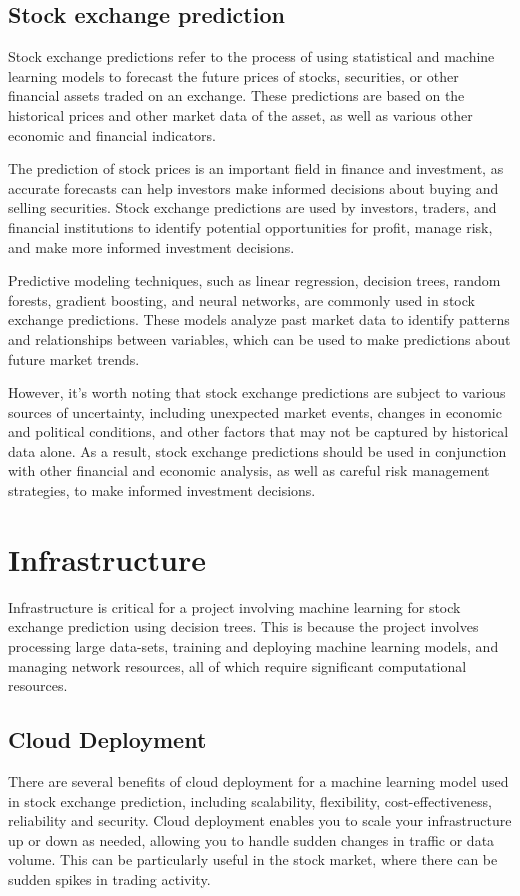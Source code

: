 \documentclass{article}
\begin{document}
\subsection{Stock exchange prediction }
Stock exchange predictions refer to the process of using statistical and machine learning models to forecast the future prices of stocks, securities, or other financial assets traded on an exchange. These predictions are based on the historical prices and other market data of the asset, as well as various other economic and financial indicators.

The prediction of stock prices is an important field in finance and investment, as accurate forecasts can help investors make informed decisions about buying and selling securities. Stock exchange predictions are used by investors, traders, and financial institutions to identify potential opportunities for profit, manage risk, and make more informed investment decisions.

Predictive modeling techniques, such as linear regression, decision trees, random forests, gradient boosting, and neural networks, are commonly used in stock exchange predictions. These models analyze past market data to identify patterns and relationships between variables, which can be used to make predictions about future market trends.

However, it's worth noting that stock exchange predictions are subject to various sources of uncertainty, including unexpected market events, changes in economic and political conditions, and other factors that may not be captured by historical data alone. As a result, stock exchange predictions should be used in conjunction with other financial and economic analysis, as well as careful risk management strategies, to make informed investment decisions.

\section{Infrastructure }
Infrastructure is critical for a project involving machine learning for stock exchange prediction using decision trees. This is because the project involves processing large data-sets, training and deploying machine learning models, and managing network resources, all of which require significant computational resources.

\subsection{Cloud Deployment}
There are several benefits of cloud deployment for a machine learning model used in stock exchange prediction, including scalability, flexibility, cost-effectiveness, reliability and security. 
Cloud deployment enables you to scale your infrastructure up or down as needed, allowing you to handle sudden changes in traffic or data volume. This can be particularly useful in the stock market, where there can be sudden spikes in trading activity.
\end{document}
